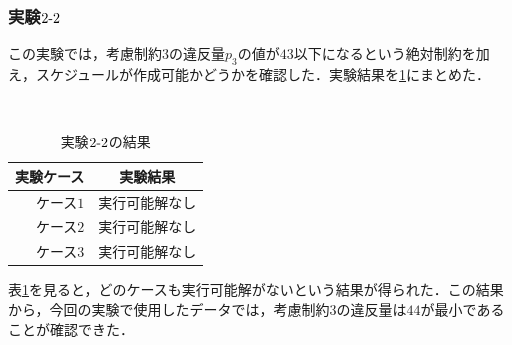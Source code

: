 \documentclass[a4paper,12pt,fleqn]{jarticle}
\begin{document}
\subsubsection{実験$2\mathchar`-2$}
この実験では，考慮制約$3$の違反量$p_3$の値が$43$以下になるという絶対制約を加え，スケジュールが作成可能かどうかを確認した．実験結果を\ref{tb:jikkenyz}にまとめた．
\begin{table}[H]\
  \begin{center}
    \caption{実験$2\mathchar`-2$の結果}
    \label{tb:jikkenyz}
    \begin{tabular}{r|c} \toprule
    実験ケース & 実験結果\\ \toprule
    ケース$1$ & 実行可能解なし\\
    ケース$2$ & 実行可能解なし\\
    ケース$3$ & 実行可能解なし\\ \toprule
    \end{tabular}
    \end{center}
\end{table}
表\ref{tb:jikkenyz}を見ると，どのケースも実行可能解がないという結果が得られた．この結果から，今回の実験で使用したデータでは，考慮制約$3$の違反量は$44$が最小であることが確認できた．
\end{document}
